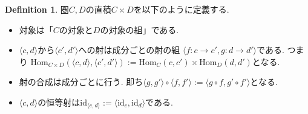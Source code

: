 \documentclass[a4paper,10pt]{article}
\theoremstyle{definition}
\newtheorem{definition}[thm]{\bfseries Definition}
\begin{document}
\begin{definition}
    圏$C, D$の直積$C \times D$を以下のように定義する.
    \begin{itemize}
        \item 対象は「$C$の対象と$D$の対象の組」である.
        \item $\langle c,d \rangle$から$\langle c',d' \rangle$への射は成分ごとの射の組
        $\langle f:c \rightarrow c', g: d \rightarrow d' \rangle$である. つまり
        $\textrm{Hom}_{C \times D}(\langle c,d \rangle, \langle c',d' \rangle):=
        \textrm{Hom}_C(c,c') \times \textrm{Hom}_D(d,d')$となる.
        \item 射の合成は成分ごとに行う. 即ち$\langle g, g' \rangle \circ \langle f,f' \rangle
        :=\langle g \circ f, g' \circ f'\rangle$となる.
        \item $\langle c,d \rangle$の恒等射は$\textrm{id}_{\langle c,d \rangle}:=
        \langle \textrm{id}_{c}, \textrm{id}_d \rangle$である.
    \end{itemize}
\end{definition}
\end{document}

